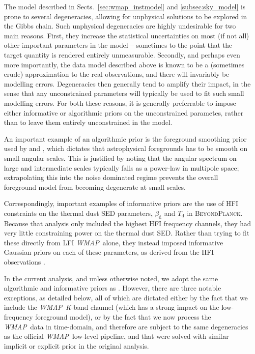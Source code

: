 \documentclass[twocolumn]{../../common/aa}
\def\WMAP{\emph{WMAP}}
\newcommand{\bp}{\textsc{BeyondPlanck}}
\newcommand{\K}[0]{\textit K}
\begin{document}
The model described in Sects.~\ref{sec:wmap_instmodel} and \ref{subsec:sky_model} is prone to several degeneracies, allowing for unphysical solutions to be explored in the Gibbs chain. Such unphysical degeneracies are highly undesirable for two main reasons. First, they increase the statistical uncertainties on most (if not all) other important parameters in the model -- sometimes to the point that the target quantity is rendered entirely unmeasurable. Secondly, and perhaps even more importantly, the data model described above is known to be a (sometimes crude) approximation to the real observations, and there will invariably be modelling errors. Degeneracies then generally tend to amplify their impact, in the sense that any unconstrained parameters will typically be used to fit such small modelling errors. For both these reasons, it is generally preferrable to impose either informative or algorithmic priors on the unconstrained parametes, rather than to leave them entirely unconstrained in the model.

An important example of an algorithmic prior is the foreground smoothing prior used by \citet{planck2016-l04} and \citet{bp12}, which dictates that astrophysical foregrounds has to be smooth on small angular scales. This is justified by noting that the angular spectrum on large and intermediate scales typically falls as a power-law in multipole space; extrapolating this into the noise dominated regime prevents the overall foreground model from becoming degenerate at small scales.

Correspondingly, important examples of informative priors are the use of HFI constraints on the thermal dust SED parameters, $\beta_{\mathrm{d}}$ and $T_{\mathrm{d}}$ in \bp. Because that analysis only included the highest HFI frequency channels, they had very little constraining power on the thermal dust SED. Rather than trying to fit these directly from LFI \WMAP\ alone, they instead imposed informative Gaussian priors on each of these parameters, as derived from the HFI observations \citep{planck2016-l04}.

In the current analysis, and unless otherwise noted, we adopt the same algorithmic and informative priors as \citet{bp01}. However, there are three notable exceptions, as detailed below, all of which are dictated either by the fact that we include the \WMAP\ \K-band channel (which has a strong impact on the low-frequency foreground model), or by the fact that we now process the \WMAP\ data in time-domain, and therefore are subject to the same degeneracies as the official \WMAP\ low-level pipeline, and that were solved with similar implicit or explicit prior in the original analysis.
\end{document}
